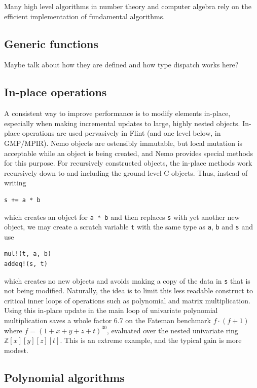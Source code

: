 \documentclass{sig-alternate-05-2015}
\begin{document}
Many high level algorithms in number theory and computer algebra rely on
the efficient implementation of fundamental algorithms.

\subsection{Generic functions}

Maybe talk about how they are defined and how type dispatch works here?

\subsection{In-place operations}

A consistent way to improve performance is to modify
elements in-place, especially when making incremental updates
to large, highly nested objects.
In-place operations are used pervasively in Flint (and one level below, in GMP/MPIR).
Nemo objects are ostensibly immutable, but local mutation is
acceptable while an object is being created,
and Nemo provides special methods for this purpose.
For recursively constructed objects, the in-place methods work
recursively down to and including the ground level C objects.
Thus, instead of writing
\begin{verbatim}
s += a * b
\end{verbatim}
which creates an object for \texttt{a * b}
and then replaces \texttt{s} with yet another new object, we may
create a scratch variable \texttt{t} with the same type as \texttt{a}, \texttt{b} and \texttt{s} and use
\begin{verbatim}
mul!(t, a, b)
addeq!(s, t)
\end{verbatim}
which creates no new objects and avoids making a copy of the data in \texttt{s}
that is not being modified.
Naturally, the idea is to limit this less readable construct to
critical inner loops of operations such as polynomial
and matrix multiplication.
Using this in-place update in the main loop of univariate polynomial
multiplication saves a whole factor 6.7 on the Fateman benchmark
$f \cdot (f+1)$ where
$f = (1 + x + y + z + t)^{30}$, evaluated over the nested univariate
ring $\mathbb{Z}[x][y][z][t]$. This is an extreme example, and
the typical gain is more modest.

\subsection{Polynomial algorithms}
\end{document}
